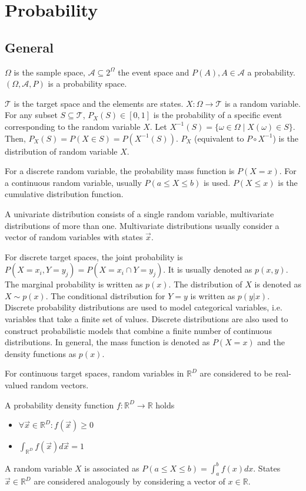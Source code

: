 \section{Probability}

\subsection{General}
$\Omega$ is the sample space,
$\mathcal{A} \subseteq 2^{\Omega}$ the event space and
$P(A), A \in \mathcal{A}$ a probability.
$(\Omega, \mathcal{A}, P)$ is a probability space.

$\mathcal{T}$ is the target space and the elements are states.
$X : \Omega \to \mathcal{T}$ is a random variable.
For any subset $S \subseteq \mathcal{T}$,
$P_X(S) \in [0, 1]$ is the probability of a specific event corresponding
to the random variable $X$.
Let $X^{-1}(S) = \{ \omega \in \Omega \mid X(\omega) \in S \}$.
Then, $P_X(S) = P(X \in S) = P(X^{-1}(S))$.
$P_X$ (equivalent to $P \circ X^{-1}$) is the distribution of
random variable $X$.

For a discrete random variable, the probability mass function is
$P(X = x)$.
For a continuous random variable, usually $P(a \leq X \leq b)$ is used.
$P(X \leq x)$ is the cumulative distribution function.

A univariate distribution consists of a single random variable,
multivariate distributions of more than one.
Multivariate distributions usually consider a vector of random variables
with states $\vec{x}$.

For discrete target spaces, the joint probability is
$P(X = x_i, Y = y_j) = P(X = x_i \cap Y = y_j)$.
It is usually denoted as $p(x, y)$.
The marginal probability is written as $p(x)$.
The distribution of $X$ is denoted as $X \sim p(x)$.
The conditional distribution for $Y = y$ is written as $p(y | x)$.
Discrete probability distributions are used to model
categorical variables, i.e. variables that take a finite set of values.
Discrete distributions are also used to construct probabilistic models
that combine a finite number of continuous distributions.
In general, the mass function is denoted as $P(X = x)$ and the density
functions as $p(x)$.

For continuous target spaces,
random variables in $\mathbb{R}^D$ are considered to be
real-valued random vectors.

A probability density function $f : \mathbb{R}^D \to \mathbb{R}$ holds
\begin{itemize}
    \item $\forall \vec{x} \in \mathbb{R}^D : f(\vec{x}) \geq 0$
    \item $\int_{\mathbb{R}^D}{f(\vec{x}) d\vec{x}} = 1$
\end{itemize}
A random variable $X$ is associated as
$P(a \leq X \leq b) = \int_a^b{f(x) dx}$.
States $\vec{x} \in \mathbb{R}^D$ are considered analogously by
considering a vector of $x \in \mathbb{R}$.

